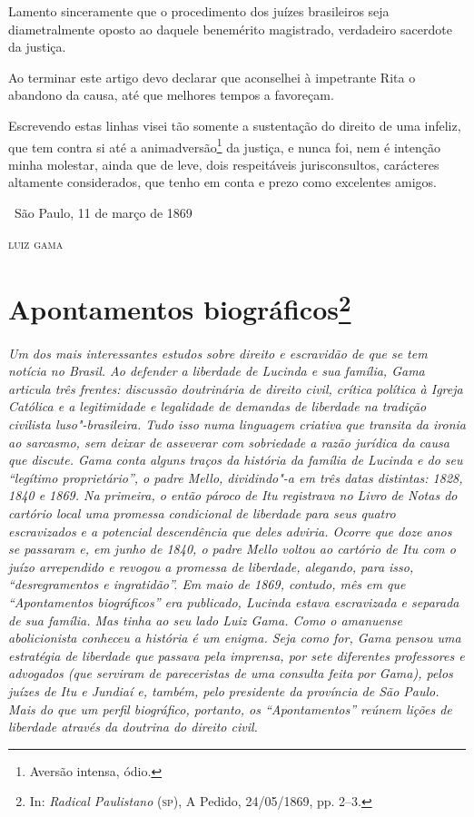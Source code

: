 Lamento sinceramente que o procedimento dos juízes brasileiros seja
diametralmente oposto ao daquele benemérito magistrado, verdadeiro
sacerdote da justiça.

Ao terminar este artigo devo declarar que aconselhei à impetrante Rita o
abandono da causa, até que melhores tempos a favoreçam.

Escrevendo estas linhas visei tão somente a sustentação do direito de
uma infeliz, que tem contra si até a animadversão\footnote{Aversão
  intensa, ódio.} da
justiça, e nunca foi, nem é intenção minha molestar, ainda que de leve,
dois respeitáveis jurisconsultos, carácteres altamente considerados, que
tenho em conta e prezo como excelentes amigos.

\vfill

\hfill\ São Paulo, 11 de março de 1869\smallskip

\hfill\textsc{luiz gama}



\chapter{Apontamentos biográficos\footnote[*]{In: \emph{Radical
  Paulistano} (\textsc{sp}), A Pedido, 24/05/1869, pp. 2--3.}}

\begin{flushleft}
{\footnotesize\itshape
Um dos mais interessantes estudos sobre direito
e escravidão de que se tem notícia no Brasil. Ao defender a
liberdade de Lucinda e sua família, Gama articula três frentes:
discussão doutrinária de direito civil, crítica política à Igreja
Católica e a legitimidade e legalidade de demandas de liberdade na
tradição civilista luso"-brasileira. Tudo isso numa
linguagem criativa que transita da ironia ao sarcasmo, sem deixar de
asseverar com sobriedade a razão jurídica da causa que discute. Gama
conta alguns traços da história da família de Lucinda e do seu ``legítimo
proprietário'', o padre Mello, dividindo"-a em três datas distintas:
1828, 1840 e 1869. Na primeira,
o então pároco de Itu registrava no Livro de Notas
do cartório local uma promessa condicional de liberdade para seus quatro
escravizados e a potencial descendência que deles adviria.
Ocorre que doze anos se passaram e, em junho de 1840, o padre Mello voltou ao
cartório de Itu com o juízo arrependido e revogou a promessa de
liberdade, alegando, para isso, ``desregramentos e ingratidão''. Em maio
de 1869, contudo, mês em que ``Apontamentos biográficos'' era publicado,
Lucinda estava escravizada e separada de sua família. Mas tinha ao seu
lado Luiz Gama. Como o amanuense abolicionista conheceu a história é um
enigma. Seja como for, Gama pensou uma estratégia de liberdade que
passava pela imprensa, por sete diferentes professores e advogados (que
serviram de pareceristas de uma consulta feita por Gama), pelos juízes
de Itu e Jundiaí e, também, pelo presidente da província de São Paulo.
Mais do que um perfil biográfico, portanto, os ``Apontamentos'' reúnem
lições de liberdade através da doutrina do direito civil. }
\end{flushleft}


